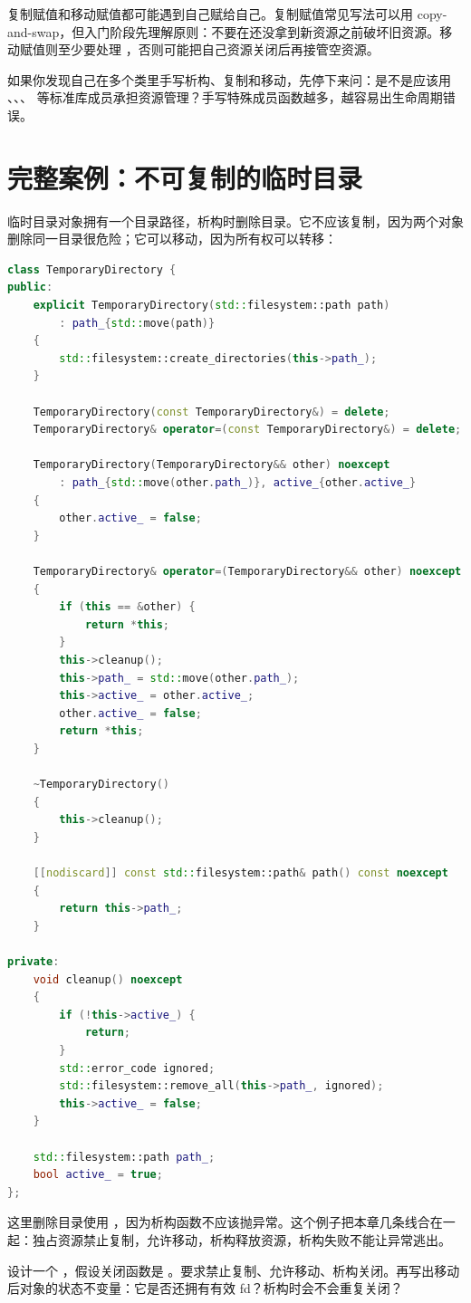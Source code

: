 复制赋值和移动赋值都可能遇到自己赋给自己。复制赋值常见写法可以用 copy-and-swap，但入门阶段先理解原则：不要在还没拿到新资源之前破坏旧资源。移动赋值则至少要处理 ，否则可能把自己资源关闭后再接管空资源。

\begin{warningbox}
如果你发现自己在多个类里手写析构、复制和移动，先停下来问：是不是应该用 、、、 等标准库成员承担资源管理？手写特殊成员函数越多，越容易出生命周期错误。
\end{warningbox}

\section{完整案例：不可复制的临时目录}

临时目录对象拥有一个目录路径，析构时删除目录。它不应该复制，因为两个对象删除同一目录很危险；它可以移动，因为所有权可以转移：

\begin{lstlisting}[language=C++,caption={临时目录所有权类型}]
class TemporaryDirectory {
public:
    explicit TemporaryDirectory(std::filesystem::path path)
        : path_{std::move(path)}
    {
        std::filesystem::create_directories(this->path_);
    }

    TemporaryDirectory(const TemporaryDirectory&) = delete;
    TemporaryDirectory& operator=(const TemporaryDirectory&) = delete;

    TemporaryDirectory(TemporaryDirectory&& other) noexcept
        : path_{std::move(other.path_)}, active_{other.active_}
    {
        other.active_ = false;
    }

    TemporaryDirectory& operator=(TemporaryDirectory&& other) noexcept
    {
        if (this == &other) {
            return *this;
        }
        this->cleanup();
        this->path_ = std::move(other.path_);
        this->active_ = other.active_;
        other.active_ = false;
        return *this;
    }

    ~TemporaryDirectory()
    {
        this->cleanup();
    }

    [[nodiscard]] const std::filesystem::path& path() const noexcept
    {
        return this->path_;
    }

private:
    void cleanup() noexcept
    {
        if (!this->active_) {
            return;
        }
        std::error_code ignored;
        std::filesystem::remove_all(this->path_, ignored);
        this->active_ = false;
    }

    std::filesystem::path path_;
    bool active_ = true;
};
\end{lstlisting}

这里删除目录使用 ，因为析构函数不应该抛异常。这个例子把本章几条线合在一起：独占资源禁止复制，允许移动，析构释放资源，析构失败不能让异常逃出。

\begin{exercisebox}
设计一个 ，假设关闭函数是 。要求禁止复制、允许移动、析构关闭。再写出移动后对象的状态不变量：它是否还拥有有效 fd？析构时会不会重复关闭？
\end{exercisebox}
